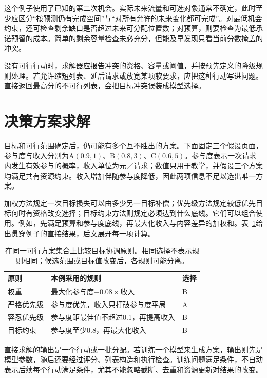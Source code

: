这个例子使用了已知的第二次机会。实际未来流量和可选对象通常不确定，此时至少应区分“按预测仍有完成空间”与“对所有允许的未来变化都可完成”。对最低机会约束，还可检查剩余缺口是否超过未来可分配位置数；对预算，则要检查为最低承诺预留的成本。简单的剩余容量检查未必充分，但能及早发现只看当前分数掩盖的冲突。

没有可行行动时，求解器应报告冲突的资格、容量或阈值，并按预先定义的降级规则处理。若允许缩短列表、延后请求或放宽某项软要求，应把这种行动写进问题。直接返回最高分的不可行列表，会把目标冲突误装成模型选择。

\section{决策方案求解}
\label{sec:rs-decision-solvers}

目标和可行范围确定后，仍可能有多个互不胜出的方案。下面固定三个假设页面，参与度与收入分别为A$(0.9,1)$、B$(0.8,3)$、C$(0.6,5)$。参与度表示一次请求内发生有效参与的概率，收入单位为元／请求；数值只用于教学，并假设三个方案均满足共有资源约束。收入增加伴随参与度降低，因此两项信息不足以选出唯一方案。

加权方法规定一次目标损失可以由多少另一目标补偿；优先级方法规定较低优先目标何时有资格改变选择；目标约束方法则规定必须达到什么底线。它们可以组合使用。例如，先满足预算和参与度底线，再最大化收入与内容差异的加权和。表~\ref{tab:rs-objective-coordination}给出贯穿例子的直接结果，后文展开每一项计算。

\begin{table}[htbp]
 \centering
 \small
 \begin{tabularx}{\linewidth}{@{}p{24mm}X p{14mm}@{}}
  \toprule
  原则 & 本例采用的规则 & 选择 \\
  \midrule
  权重 & 最大化参与度$+0.08\times$收入 & B \\
  严格优先级 & 参与度优先，收入只打破参与度平局 & A \\
  容忍优先级 & 参与度距最佳值不超过0.1，再提高收入 & B \\
  目标约束 & 参与度至少0.8，再最大化收入 & B \\
  \bottomrule
 \end{tabularx}
 \caption{在同一可行方案集合上比较目标协调原则。相同选择不表示规则相同；候选范围或目标值改变后，各规则可能分离。}
 \label{tab:rs-objective-coordination}
\end{table}

直接求解的输出是一个行动或一批分配。若训练一个模型来生成方案，输出则先是模型参数，随后还要经过评分、列表构造和执行检查。训练问题满足条件，不自动表示后续每个行动满足条件，尤其不能忽略截断、去重和资源更新对结果的改变。

